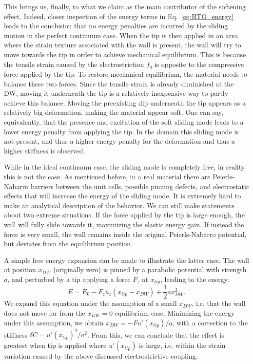This brings us, finally, to what we claim as the main contributor of the softening effect.
Indeed, closer inspection of the energy terms in Eq.~\ref{eq:BTO_energy} leads to the conclusion that no energy penalties are incurred by the sliding motion in the perfect continuum case.
When the tip is then applied in an area where the strain texture associated with the wall is present, the wall will try to move towards the tip in order to achieve mechanical equilibrium.
This is because the tensile strain caused by the electrostriction $f_q$ is opposite to the compressive force applied by the tip.
To restore mechanical equilibrium, the material needs to balance these two forces.
Since the tensile strain is already diminished at the DW, moving it underneath the tip is a relatively inexpensive way to partly achieve this balance.
Moving the preexisting dip underneath the tip appears as a relatively big deformation, making the material appear soft.
One can say, equivalently, that the presence and excitation of the soft sliding mode leads to a lower energy penalty from applying the tip.
In the domain this sliding mode is not present, and thus a higher energy penalty for the deformation and thus a higher stiffness is observed.

While in the ideal continuum case, the sliding mode is completely free, in reality this is not the case.
As mentioned before, in a real material there are Peierls-Nabarro barriers between the unit cells, possible pinning defects, and electrostatic effects that will increase the energy of the sliding mode.
It is extremely hard to make an analytical description of the behavior.
We can still make statements about two extreme situations.
If the force applied by the tip is large enough, the wall will fully slide towards it, maximizing the elastic energy gain.
If instead the force is very small, the wall remains inside the original Peierls-Nabarro potential, but deviates from the equilibrium position.

A simple free energy expansion can be made to illustrate the latter case.
The wall at position $x_{DW}$ (originally zero) is pinned by a parabolic potential with strength $a$, and perturbed by a tip applying a force $F_z$ at $x_{tip}$, leading to the energy:
\begin{equation}
	E = E_0 - F_z u_z (x_{tip} - x_{DW}) + \frac{1}{2}a x_{DW}^2.
\end{equation}
We expand this equation under the assumption of a small $x_{DW}$, i.e. that the wall does not move far from the $x_{DW}=0$ equilibrium case.
Minimizing the energy under this assumption, we obtain $x_{DW} = -F u'(x_{tip})/a$, with a correction to the stiffness $\delta C = u'(x_{tip})^2/a^2$.
From this, we can conclude that the effect is greatest when tip is applied where $u'(x_{tip})$ is large, i.e. within the strain variation caused by the above discussed electrostrictive coupling.

